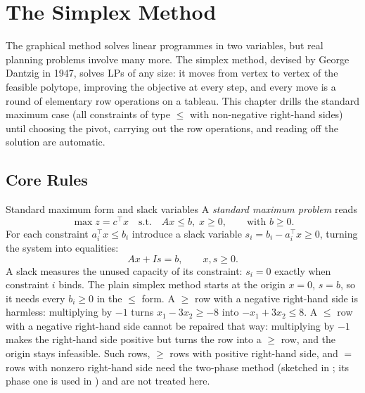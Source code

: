 \chapter{The Simplex Method}

The graphical method solves linear programmes in two variables, but real
planning problems involve many more. The simplex method, devised by George Dantzig in 1947, solves LPs of
any size: it moves from vertex to vertex of the feasible polytope, improving
the objective at every step, and every move is a round of
elementary row operations on a tableau. This chapter drills the standard
maximum case (all constraints of type $\le$ with non-negative right-hand
sides) until choosing the pivot, carrying out the row operations, and
reading off the solution are automatic.

\section{Core Rules}

\begin{rulebox}{Standard maximum form and slack variables}
A \emph{standard maximum problem} reads
\[
  \max z=c^{\top}x \quad\text{s.t.}\quad Ax\le b,\; x\ge 0,
  \qquad\text{with } b\ge 0 .
\]
For each constraint $a_i^{\top}x\le b_i$ introduce a slack variable $s_i=b_i-a_i^{\top}x\ge 0$, turning the system into
equalities:
\[
  Ax+Is=b,\qquad x,s\ge 0 .
\]
A slack measures the unused capacity of its constraint: $s_i=0$ exactly
when constraint $i$ binds. The plain simplex method starts at the origin
$x=0$, $s=b$, so it needs every $b_i\ge 0$ in the $\le$ form. A $\ge$ row
with a negative right-hand side is harmless: multiplying by $-1$ turns
$x_1-3x_2\ge -8$ into $-x_1+3x_2\le 8$. A $\le$ row with a negative
right-hand side cannot be repaired that way: multiplying by $-1$ makes the
right-hand side positive but turns the row into a $\ge$ row, and the origin
stays infeasible. Such rows, $\ge$ rows with positive right-hand side, and
$=$ rows with nonzero right-hand side need the two-phase method (sketched in ; its phase
one is used in ) and are not treated here.
\end{rulebox}

